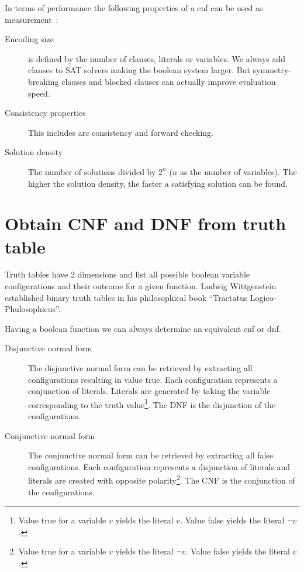 In terms of performance the following properties of a \gls{cnf} can be used as measurement~\cite{Sat20}:
\begin{description}
  \item[Encoding size]
    is defined by the number of clauses, literals or variables.
    We always add clauses to SAT solvers making the boolean system larger. But symmetry-breaking clauses and blocked clauses can actually improve evaluation speed.
  \item[Consistency properties]
    This includes arc consistency and forward checking.
  \item[Solution density]
    The number of solutions divided by $2^n$ ($n$ as the number of variables). The higher the solution density, the faster a satisfying solution can be found.
\end{description}

\section{Obtain CNF and DNF from truth table}
\label{sec:cnf-dnf}
%
Truth tables have 2 dimensions and list all possible boolean variable configurations and their outcome for a given function. Ludwig Wittgenstein established binary truth tables in his philosophical book ``Tractatus Logico-Phulosophicus''.

Having a boolean function we can always determine an equivalent \gls{cnf} or \gls{dnf}.

\begin{description}
  \item[Disjunctive normal form]
    The disjunctive normal form can be retrieved by extracting all configurations resulting in value true. Each configuration represents a conjunction of literals. Literals are generated by taking the variable corresponding to the truth value\footnote{Value true for a variable $v$ yields the literal $v$. Value false yields the literal $\neg v$.}. The DNF is the disjunction of the configurations.
  \item[Conjunctive normal form]
    The conjunctive normal form can be retrieved by extracting all false configurations. Each configuration represents a disjunction of literals and literals are created with opposite polarity\footnote{Value true for a variable $v$ yields the literal $\neg v$. Value false yields the literal $v$.}. The CNF is the conjunction of the configurations.
\end{description}

